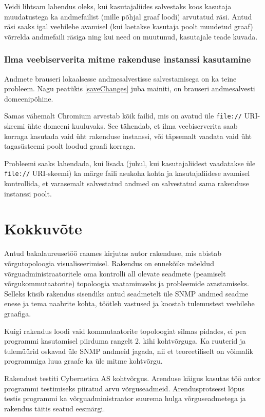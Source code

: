 \documentclass[12pt]{article}
\begin{document}
Veidi lihtsam lahendus oleks, kui kasutajaliides salvestaks koos kasutaja muudatustega ka
andmefailist (mille põhjal graaf loodi) arvutatud räsi.
Antud räsi saaks igal veebilehe avamisel (kui laetakse kasutaja poolt muudetud graaf) võrrelda
andmefaili räsiga ning kui need on muutunud, kasutajale teade kuvada.

\subsubsection{Ilma veebiserverita mitme rakenduse instanssi kasutamine}
Andmete brauseri lokaalsesse andmesalvestisse salvestamisega on ka teine probleem.
Nagu peatükis \ref{saveChanges} juba mainiti, on brauseri andmesalvesti domeenipõhine.

Samas vähemalt Chromium arvestab kõik failid, mis on avatud üle \texttt{file://} URI-skeemi ühte
domeeni kuuluvaks.
See tähendab, et ilma veebiserverita saab korraga kasutada vaid üht rakenduse instanssi, või
täpsemalt vaadata vaid üht tagasüsteemi poolt loodud graafi korraga.

Probleemi saaks lahendada, kui lisada (juhul, kui kasutajaliidest vaadatakse üle \texttt{file://}
URI-skeemi) ka märge faili asukoha kohta ja kasutajaliidese avamisel kontrollida, et varasemalt
salvestatud andmed on salvestatud sama rakenduse instanssi poolt.

\clearpage
\section{Kokkuvõte}

Antud bakalaureusetöö raames kirjutas autor rakenduse, mis abistab võrgutopoloogia
visualiseerimisel.
Rakendus on ennekõike mõeldud võrguadministraatoritele oma kontrolli all olevate seadmete (peamiselt
võrgukommutaatorite) topoloogia vaatamimseks ja probleemide avastamiseks.
Selleks küsib rakendus sisendiks antud seadmetelt üle SNMP andmed seadme enese ja tema naabrite
kohta, töötleb vastused ja koostab tulemustest veebilehe graafiga.

Kuigi rakendus loodi vaid kommutaatorite topoloogiat silmas pidades, ei pea programmi kasutamisel
piirduma rangelt 2. kihi kohtvõrguga.
Ka ruuterid ja tulemüürid oskavad üle SNMP andmeid jagada, nii et teoreetiliselt on võimalik
programmiga luua graafe ka üle mitme kohtvõrgu.

Rakendust testiti Cybernetica AS kohtvõrgus.
Arenduse käigus kasutas töö autor programmi testimiseks piiratud arvu võrguseadmeid.
Arendusprotsessi lõpus testis programmi ka võrguadministraator suurema hulga võrguseadmetega ja
rakendus täitis seatud eesmärgi.
\end{document}
